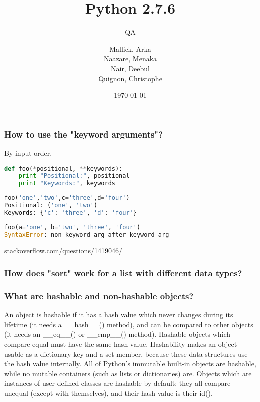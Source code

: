 \documentclass{beamer}
\begin{document}
\title{Python 2.7.6}
\subtitle{QA}
\author{
  Mallick, Arka\\
  Naazare, Menaka \\
  Nair, Deebul\\
  Quignon, Christophe \\
} 
\date{\today}

\begin{frame}
\titlepage
\end{frame}


\begin{frame}[fragile]
\frametitle{How to use the "keyword arguments"?}
By input order.
\begin{lstlisting}[language=Python]
def foo(*positional, **keywords):
    print "Positional:", positional
    print "Keywords:", keywords
\end{lstlisting}

\begin{lstlisting}[language=Python]
foo('one','two',c='three',d='four')
Positional: ('one', 'two')
Keywords: {'c': 'three', 'd': 'four'}
\end{lstlisting}
\begin{lstlisting}[language=Python]
 foo(a='one', b='two', 'three', 'four')
SyntaxError: non-keyword arg after keyword arg
\end{lstlisting}
\hbox{}
\hbox{}
\scriptsize
\hfill{}\href{http://stackoverflow.com/questions/1419046/}{stackoverflow.com/questions/1419046/}

\end{frame}


\begin{frame}[fragile]
\frametitle{How does "sort" work for a list with different data types?}

\end{frame}


\begin{frame}[fragile]
\frametitle{What are hashable and non-hashable objects?}
An object is hashable if it has a hash value which never changes during its lifetime (it needs a \_\_hash\_\_() method), 
and can be compared to other objects (it needs an \_\_eq\_\_() or \_\_cmp\_\_() method). 
Hashable objects which compare equal must have the same hash value. 
Hashability makes an object usable as a dictionary key and a set member, because these data structures use the hash value internally. 
All of Python’s immutable built-in objects are hashable, while no mutable containers (such as lists or dictionaries) are. 
Objects which are instances of user-defined classes are hashable by default; they all compare unequal (except with themselves), 
and their hash value is their id().
 
\end{frame}
\end{document}

